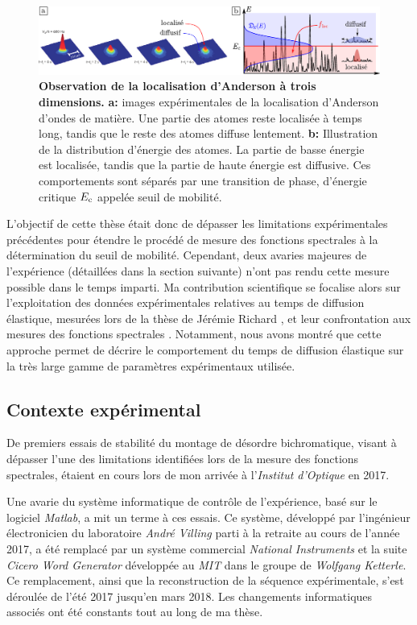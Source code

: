 \begin{figure}
\centering
\includegraphics[width=\textwidth]{Fig/Introduction/AL3D.pdf}
\caption{\textbf{Observation de la localisation d'Anderson à trois dimensions.} \textbf{a:} images expérimentales de la localisation d'Anderson d'ondes de matière. Une partie des atomes reste localisée à temps long, tandis que le reste des atomes diffuse lentement. \textbf{b:} Illustration de la distribution d'énergie des atomes. La partie de basse énergie est localisée, tandis que la partie de haute énergie est diffusive. Ces comportements sont séparés par une transition de phase, d'énergie critique $E_{\mathrm{c}}$ appelée seuil de mobilité.}
\label{fig:AL3D}
\end{figure}

L'objectif de cette thèse était donc de dépasser les limitations expérimentales précédentes pour étendre le procédé de mesure des fonctions spectrales à la détermination du seuil de mobilité. Cependant, deux avaries majeures de l'expérience (détaillées dans la section suivante) n'ont pas rendu cette mesure possible dans le temps imparti. Ma contribution scientifique se focalise alors sur l'exploitation des données expérimentales relatives au temps de diffusion élastique, mesurées lors de la thèse de Jérémie Richard \citep{richard2015propagation}\citep{richard2019elastic}, et leur confrontation aux mesures des fonctions spectrales \citep{signoles2019ultracold}. Notamment, nous avons montré que cette approche permet de décrire le comportement du temps de diffusion élastique sur la très large gamme de paramètres expérimentaux utilisée.






\subsection{Contexte expérimental}
De premiers essais de stabilité du montage de désordre bichromatique, visant à dépasser l'une des limitations identifiées lors de la mesure des fonctions spectrales, étaient en cours lors de mon arrivée à l'\emph{Institut d'Optique} en 2017.

Une avarie du système informatique de contrôle de l'expérience, basé sur le logiciel \emph{Matlab}, a mit un terme à ces essais. Ce système, développé par l'ingénieur électronicien du laboratoire \emph{André Villing} parti à la retraite au cours de l'année 2017, a été remplacé par un système commercial \emph{National Instruments} et la suite \emph{Cicero Word Generator} développée au \emph{MIT} dans le groupe de \emph{Wolfgang Ketterle}. Ce remplacement, ainsi que la reconstruction de la séquence expérimentale, s'est déroulée de l'été 2017 jusqu'en mars 2018. Les changements informatiques associés ont été constants tout au long de ma thèse.

